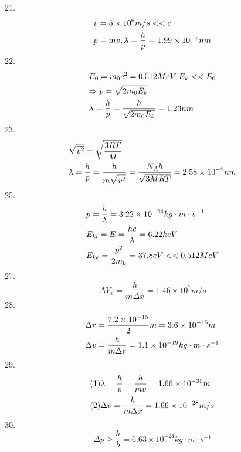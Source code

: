 \documentclass{article}
\begin{document}
21.\[\begin{gathered}
v = 5 \times {10^6}m/s <  < c \hfill \\
p = mv,\lambda  = \frac{h}{p} = 1.99 \times {10^{ - 5}}nm \hfill \\ 
\end{gathered} \]
22.\[\begin{gathered}
{E_0} = {m_0}{c^2} = 0.512MeV,{E_k} <  < {E_0} \hfill \\
\Rightarrow p = \sqrt {2{m_0}{E_k}}  \hfill \\
\lambda  = \frac{h}{p} = \frac{h}{{\sqrt {2{m_0}{E_k}} }} = 1.23nm \hfill \\ 
\end{gathered} \]
23.\[\begin{gathered}
\sqrt {\overline {{v^2}} }  = \sqrt {\frac{{3RT}}{M}}  \hfill \\
\lambda  = \frac{h}{p} = \frac{h}{{m\sqrt {\overline {{v^2}} } }} = \frac{{{N_A}h}}{{\sqrt {3MRT} }} = 2.58 \times {10^{ - 2}}nm \hfill \\ 
\end{gathered} \]
25.\[\begin{gathered}
p = \frac{h}{\lambda } = 3.22 \times {10^{ - 24}}kg \cdot m \cdot {s^{ - 1}} \hfill \\
{E_{kl}} = E = \frac{{hc}}{\lambda } = 6.22keV \hfill \\
{E_{ke}} = \frac{{{p^2}}}{{2{m_0}}} = 37.8eV <  < 0.512MeV \hfill \\ 
\end{gathered} \]
27.\[\Delta {V_x} = \frac{h}{{m\Delta x}} = 1.46 \times {10^7}m/s\]
28.\[\begin{gathered}
\Delta r = \frac{{7.2 \times {{10}^{ - 15}}}}{2}m = 3.6 \times {10^{ - 15}}m \hfill \\
\Delta v = \frac{h}{{m\Delta r}} = 1.1 \times {10^{ - 19}}kg \cdot m \cdot {s^{ - 1}} \hfill \\ 
\end{gathered} \]
29.\[\begin{gathered}
(1)\lambda  = \frac{h}{p} = \frac{h}{{mv}} = 1.66 \times {10^{ - 35}}m \hfill \\
(2)\Delta v = \frac{h}{{m\Delta x}} = 1.66 \times {10^{ - 28}}m/s \hfill \\ 
\end{gathered} \]
30.\[\Delta p \geqslant \frac{h}{b} = 6.63 \times {10^{ - 24}}kg \cdot m \cdot {s^{ - 1}}\]	
\end{document}

